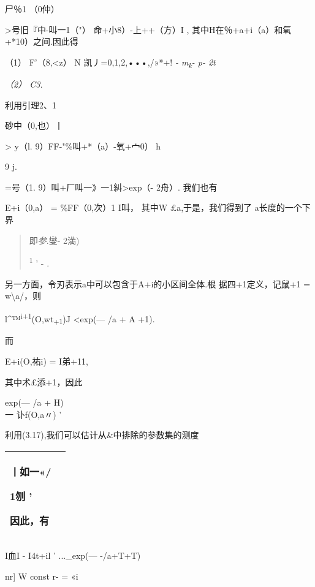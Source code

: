 \textbar{}尸％1 （0仲）\textbar{}

\textgreater{}号旧『中-叫一1（"） \textbar{}
\textbar{}命+小8）-上++（方）I , 其中H在％+a+i（a）和氧+*10）之间.因此得

（1） \textbar{}F'（8,\textless{}z） \textbar{} N 凯丿=0,1,2,•••,/»*+!
\emph{- m\textsubscript{k}- p- 2t}

\emph{（2） C3.}

利用引理2、1

\textbar{}砂中（0,也）丨

\textgreater{} y（l. 9）FF-"\%叫+*（a）-氧+宀0） h

9 j.

=号（1. 9）叫+厂叫一》一1\textbar{}糾\textgreater{}exp（- 2舟）.
我们也有

\textbar{}E+i（0,a）\textbar{} = \textbar{}\%FF（0,次）1 I叫， 其中W
£a,于是，我们得到了 a长度的一个下界

\begin{quote}
即\emph{参}.{燮- 2満)}

\textsuperscript{1} ' - .
\end{quote}

另一方面，令刃表示a中可以包含于A+i的小区间全体.根 据四+1定义，记鼠+1 =
w\textbackslash{}a/，则

l\^{}™\textsuperscript{i+1}(O,wt\textsubscript{+1})J \textless{}exp(---
/a + A +1).

而

\textbar{}E+i(O,祐i)\textbar{} = I弟+11,

其中术£添+1，因此

{exp(--- /a + H)\\
}一\textbar{} 讣f(O,a〃)\textbar{} '

利用(3.17),我们可以估计从\&中排除的参数集的测度

\begin{longtable}[]{@{}ll@{}}
\toprule
\endhead
\begin{minipage}[t]{0.47\columnwidth}\raggedright
{丨如一\textbar{}«/ \textbar{}}

1刎 '

因此，有\strut
\end{minipage} & \begin{minipage}[t]{0.47\columnwidth}\raggedright
\strut
\end{minipage}\tabularnewline
\bottomrule
\end{longtable}

I血I - I4t+il ' ...\_exp(--- -/a+T+T)

nr{]} W const r- = «i

